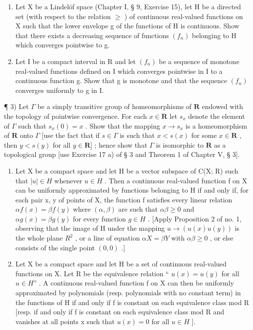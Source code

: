 \ExerciseSection

\begin{enumerate}
\def\labelenumi{\arabic{enumi})}
\item
  Let X be a Lindelöf space (Chapter I, § 9, Exercise 15), let H be a directed set (with respect to the relation \(\geqslant\) ) of continuous real-valued functions on X such that the lower envelope g of the functions of H is continuous. Show that there exists a decreasing sequence of functions \((f_{n})\) belonging to H which converges pointwise to g.
\item
  Let I be a compact interval in R and let \((f_{n})\) be a sequence of monotone real-valued functions defined on I which converges pointwise in I to a continuous function g. Show that g is monotone and that the sequence \((f_{n})\) converges uniformly to g in I.
\end{enumerate}

¶ 3) Let \(\Gamma\) be a simply transitive group of homeomorphisms of \(\mathbf{R}\) endowed with the topology of pointwise convergence. For each \(x \in \mathbf{R}\) let \(s_x\) denote the element of \(\Gamma\) such that \(s_x(0) = x\) . Show that the mapping \(x \to s_x\) is a homeomorphism of \(\mathbf{R}\) onto \(\Gamma\) {[}use the fact that if \(s \in \Gamma\) is such that \(x < s(x)\) for some \(x \in \mathbf{R}\) , then \(y < s(y)\) for all \(y \in \mathbf{R}]\) ; hence show that \(\Gamma\) is isomorphic to \(\mathbf{R}\) as a topological group {[}use Exercise 17 a) of § 3 and Theorem 1 of Chapter V, § 3{]}.

\begin{enumerate}
\def\labelenumi{\arabic{enumi})}
\setcounter{enumi}{3}
\item
  Let X be a compact space and let H be a vector subspace of C(X; R) such that \(|u| \in H\) whenever \(u \in H\) . Then a continuous real-valued function f on X can be uniformly approximated by functions belonging to H if and only if, for each pair x, y of points of X, the function f satisfies every linear relation \(\alpha f(x) = \beta f(y)\) where \((\alpha, \beta)\) are such that \(\alpha\beta \geqslant 0\) and \(\alpha g(x) = \beta g(y)\) for every function \(g \in H\) . {[}Apply Proposition 2 of no. 1, observing that the image of H under the mapping \(u \to (u(x) u(y))\) is the whole plane \(R^{2}\) , or a line of equation \(\alpha X = \beta Y\) with \(\alpha\beta \geqslant 0\) , or else consists of the single point \((0, 0)\) .{]}
\item
  Let X be a compact space and let H be a set of continuous real-valued functions on X. Let R be the equivalence relation `` \(u(x) = u(y)\) for all \(u \in H\)'' . A continuous real-valued function f on X can then be uniformly approximated by polynomials (resp. polynomials with no constant term) in the functions of H if and only if f is constant on each equivalence class mod R {[}resp. if and only if f is constant on each equivalence class mod R and vanishes at all points x such that \(u(x) = 0\) for all \(u \in H\) {]}.
\end{enumerate}

